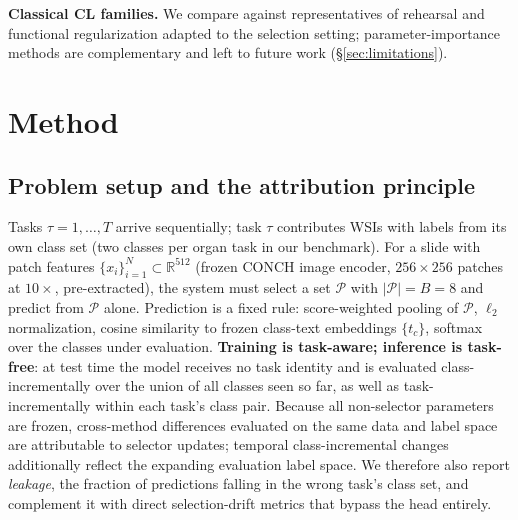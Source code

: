 \documentclass[11pt]{article}
\begin{document}
\textbf{Classical CL families.} We compare against representatives of rehearsal \citep{lopezpaz2017gem,buzzega2020derpp,rebuffi2017icarl} and functional regularization \citep{li2018lwf} adapted to the selection setting; parameter-importance methods \citep{kirkpatrick2017ewc} are complementary and left to future work (\S\ref{sec:limitations}).

\section{Method}\label{sec:method}
\subsection{Problem setup and the attribution principle}
Tasks $\tau = 1,\dots,T$ arrive sequentially; task $\tau$ contributes WSIs with labels from its own class set (two classes per organ task in our benchmark). For a slide with patch features $\{x_i\}_{i=1}^{N}\!\subset\!\mathbb{R}^{512}$ (frozen CONCH image encoder, $256{\times}256$ patches at $10\times$, pre-extracted), the system must select a set $\mathcal{P}$ with $|\mathcal{P}| = B = 8$ and predict from $\mathcal{P}$ alone. Prediction is a fixed rule: score-weighted pooling of $\mathcal{P}$, $\ell_2$ normalization, cosine similarity to frozen class-text embeddings $\{t_c\}$, softmax over the classes under evaluation. \textbf{Training is task-aware; inference is task-free}: at test time the model receives no task identity and is evaluated class-incrementally over the union of all classes seen so far, as well as task-incrementally within each task's class pair. Because all non-selector parameters are frozen, cross-method differences evaluated on the same data and label space are attributable to selector updates; temporal class-incremental changes additionally reflect the expanding evaluation label space. We therefore also report \emph{leakage}, the fraction of predictions falling in the wrong task's class set, and complement it with direct selection-drift metrics that bypass the head entirely.
\end{document}
